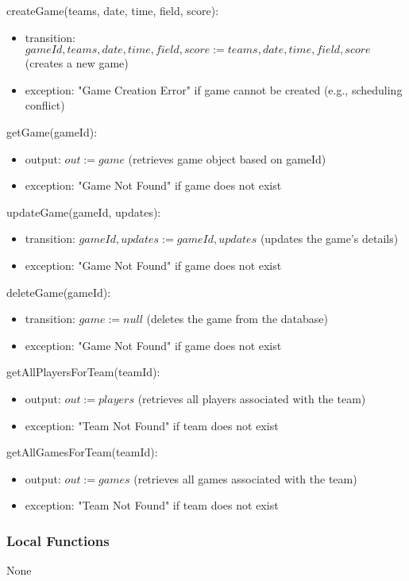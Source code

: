 \documentclass[12pt, titlepage]{article}
\begin{document}
\noindent createGame(teams, date, time, field, score):
\begin{itemize}
  \item transition: $gameId, teams, date, time, field, score := teams, date, time, field, score$ (creates a new game)
  \item exception: "Game Creation Error" if game cannot be created (e.g., scheduling conflict)
\end{itemize}

\noindent getGame(gameId):
\begin{itemize}
  \item output: $out := game$ (retrieves game object based on gameId)
  \item exception: "Game Not Found" if game does not exist
\end{itemize}

\noindent updateGame(gameId, updates):
\begin{itemize}
  \item transition: $gameId, updates := gameId, updates$ (updates the game's details)
  \item exception: "Game Not Found" if game does not exist
\end{itemize}

\noindent deleteGame(gameId):
\begin{itemize}
  \item transition: $game := null$ (deletes the game from the database)
  \item exception: "Game Not Found" if game does not exist
\end{itemize}

\noindent getAllPlayersForTeam(teamId):
\begin{itemize}
  \item output: $out := players$ (retrieves all players associated with the team)
  \item exception: "Team Not Found" if team does not exist
\end{itemize}

\noindent getAllGamesForTeam(teamId):
\begin{itemize}
  \item output: $out := games$ (retrieves all games associated with the team)
  \item exception: "Team Not Found" if team does not exist
\end{itemize}

\subsubsection{Local Functions}
None
\end{document}

